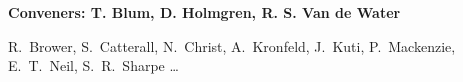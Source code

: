 

\begin{center}

\begin{large} {\bf Conveners: T. Blum, D. Holmgren, R. S. Van de Water} \end{large}

R.~Brower,
S.~Catterall,
N.~Christ,
A.~Kronfeld,
J.~Kuti,
P.~Mackenzie,
E.~T.~Neil,
S.~R.~Sharpe
\ldots

\end{center}

